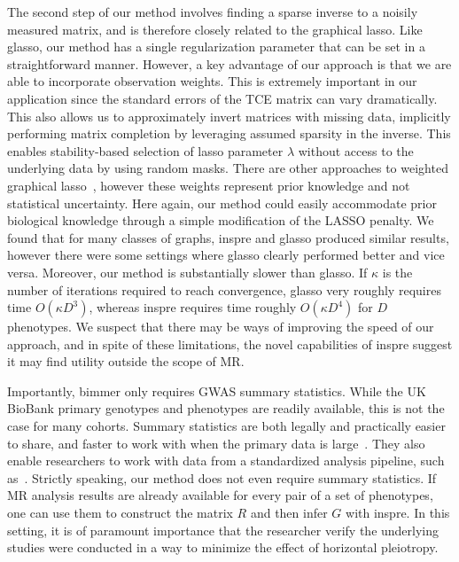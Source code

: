\documentclass{article}
\begin{document}
The second step of our method involves finding a sparse inverse to a noisily measured
matrix, and is therefore closely related to the graphical lasso. Like glasso, our method
 has a single regularization parameter that can be set in a straightforward manner.
However, a key advantage of our approach is that we are able to incorporate
observation weights. This is extremely important in our application since the standard errors
of the TCE matrix can vary dramatically. This also allows us to approximately invert matrices
with missing data, implicitly performing matrix completion by leveraging assumed
sparsity in the inverse. This enables stability-based selection of lasso parameter
 $\lambda$ without access to the underlying data by using random masks.
There are other approaches to weighted graphical lasso~\cite{Li2015,Zuo2017}, however 
these weights represent prior knowledge and not statistical uncertainty.
Here again, our method could easily accommodate prior biological knowledge through a simple
modification of the LASSO penalty.
We found that for many classes of graphs,
inspre and glasso produced similar results, however there were some settings where glasso
clearly performed better and vice versa.
Moreover, our method is substantially slower than glasso. If $\kappa$ is the number
of iterations required to reach convergence, glasso very roughly requires time
$O(\kappa D^3)$, whereas inspre requires time roughly $O(\kappa D^4)$ for $D$ phenotypes. We suspect that
there may be ways of improving the speed of our approach, and in spite of these limitations,
the novel capabilities of inspre suggest it may find utility
outside the scope of MR.

Importantly, bimmer only requires GWAS summary statistics.
While the UK BioBank primary genotypes and phenotypes are readily available,
this is not the case for many cohorts. Summary
statistics are both legally and practically easier to share, and faster to work with when the primary
data is large~\cite{Pasaniuc2017}. They also enable researchers to work with data from a
standardized analysis pipeline, such as~\cite{NealeUKBB}.
Strictly speaking, our method does not even require summary statistics. If
MR analysis results are already available for every pair of a set of phenotypes,
one can use them to construct the matrix $R$ and then infer $G$ with
inspre. In this setting, it is of paramount importance that the researcher verify
the underlying studies were conducted in a way to minimize the effect of
horizontal pleiotropy.
\end{document}
